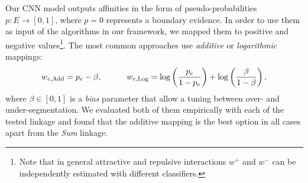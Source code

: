 Our CNN model outputs affinities in the form of pseudo-probabilities $p:E \rightarrow [0,1]$, where $p=0$ represents a boundary evidence. In order to use them as input of the algorithms in our framework, we mapped them to positive and negative values\footnote{Note that in general attractive and repulsive interactions $w^+$ and $w^-$ can be independently estimated with different classifiers.}. The most common approaches use \emph{additive} \cite{ailon2008aggregating} or \emph{logarithmic} \cite{finkel2008enforcing,andres2012globally} mappings:
\begin{equation} \label{eq:mappings}
w_{e,\mathrm{Add}} = p_e - \beta, \qquad \quad w_{e,\mathrm{Log}} = \log \left( \frac{p_e}{1-p_e} \right) + \log \left( \frac{\beta}{1-\beta} \right),
\end{equation}
where $\beta \in [0,1]$ is a \emph{bias} parameter that allow a tuning between over- and under-segmentation. We evaluated both of them empirically with each of the tested linkage and found that the additive mapping is the best option in all cases apart from the \emph{Sum} linkage. 
